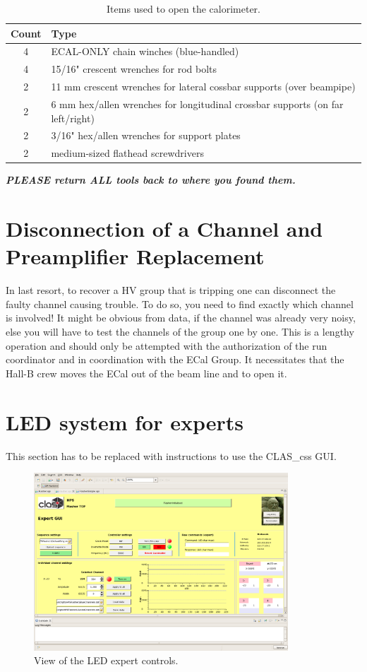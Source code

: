 \documentclass[12pt]{article}
\begin{document}
\begin{table}[htbp]\centering
    \begin{tabular}{c|l}\hline
        Count & Type \\\hline
4&   ECAL-ONLY chain winches (blue-handled)\\
4&   15/16" crescent wrenches for rod bolts\\
2&   11 mm crescent wrenches for lateral cossbar supports (over beampipe)\\
2&   6 mm hex/allen wrenches for longitudinal crossbar supports (on far left/right)\\
2&   3/16" hex/allen wrenches for support plates\\
2&   medium-sized flathead screwdrivers\\\hline
    \end{tabular}
    \caption{Items used to open the calorimeter. \label{tab:tools}}
\end{table}

{\bf\em PLEASE return ALL tools back to where you found them.}

   \section{Disconnection of a Channel and Preamplifier Replacement}
     
      In last resort, to recover a HV group that is tripping one can disconnect the faulty channel causing trouble. To do so, you need to find exactly which channel is involved! It might be obvious from data, if the channel was already very noisy, else you will have to test the channels of the group one by one. This is a lengthy operation and should only be attempted with the authorization of the run coordinator and in coordination with the ECal Group. It necessitates that the Hall-B crew moves the ECal out of the beam line and to open it.

   \section{LED system for experts}

This section has to be replaced with instructions to use the CLAS\_css GUI.

\begin{figure}[htbp]
\center
\includegraphics[width=0.85\textwidth]{pics/LEDExpert_2014_12_20.png}
\caption{\label{LEDexpert} View of the LED expert controls.}
\end{figure}
\end{document}
